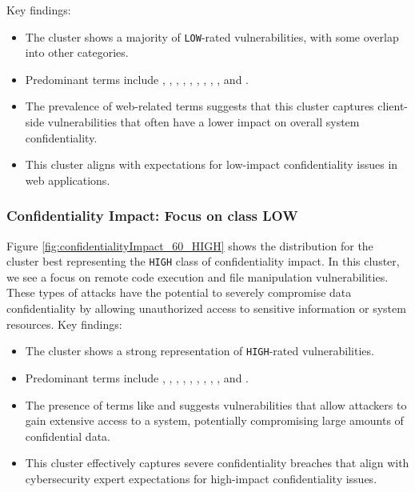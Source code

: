 \documentclass[12pt]{article}
\begin{document}
Key findings:

\begin{itemize}

	\item The cluster shows a majority of \texttt{LOW}-rated vulnerabilities, with some overlap into
	      other categories.

	\item Predominant terms include , , , , , ,
	      , , , and .

	\item The prevalence of web-related terms suggests that this cluster captures client-side
	      vulnerabilities that often have a lower impact on overall system confidentiality.

	\item This cluster aligns with expectations for low-impact confidentiality issues in web
	      applications.

\end{itemize}

\subsubsection{Confidentiality Impact: Focus on class LOW}

Figure \ref{fig:confidentialityImpact_60_HIGH} shows the distribution for the cluster best
representing the \texttt{HIGH} class of confidentiality impact. In this cluster, we see a focus
on remote code execution and file manipulation vulnerabilities. These types of attacks have the
potential to severely compromise data confidentiality by allowing unauthorized access to sensitive
information or system resources. Key findings:

\begin{itemize}

	\item The cluster shows a strong representation of \texttt{HIGH}-rated vulnerabilities.

	\item Predominant terms include , , ,
	      , , ,
	      , , , and .

	\item The presence of terms like  and  suggests vulnerabilities that allow
	      attackers to gain extensive access to a system, potentially compromising large amounts of
	      confidential data.

	\item This cluster effectively captures severe confidentiality breaches that align with
	      cybersecurity expert expectations for high-impact confidentiality issues.

\end{itemize}
\end{document}
